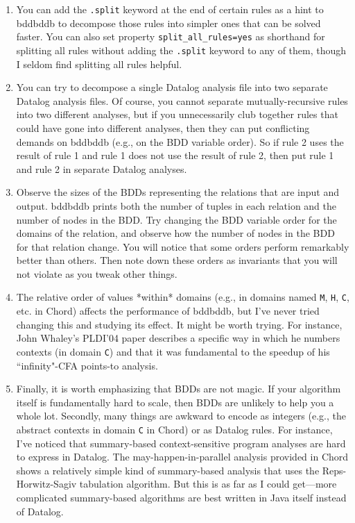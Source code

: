 \begin{enumerate}
\item
You can add the \verb+.split+ keyword at the end of certain rules as a
hint to bddbddb to decompose those rules into simpler ones that can be
solved faster.  You can also set property \verb+split_all_rules=yes+ as shorthand
for splitting all rules without adding the \verb+.split+ keyword to any of
them, though I seldom find splitting all rules helpful.

\item
You can try to decompose a single Datalog analysis file into two separate Datalog analysis
files.  Of course, you cannot separate mutually-recursive rules into two
different analyses, but if you unnecessarily club
together rules that could have gone into different analyses, then they
can put conflicting demands on bddbddb (e.g., on the BDD variable order).
So if rule 2 uses the result of rule 1 and rule 1 does not use the result of
rule 2, then put rule 1 and rule 2 in separate Datalog analyses.

\item
Observe the sizes of the BDDs representing the relations that are
input and output.  bddbddb prints both the number of tuples in each
relation and the number of nodes in the BDD.  Try changing the
BDD variable order for the domains of the relation, and observe how the
number of nodes in the BDD for that relation change.  You will
notice that some orders perform remarkably better than others.  Then
note down these orders as invariants that you will not violate as
you tweak other things.

\item
The relative order of values *within* domains (e.g.,
in domains named \verb+M+, \verb+H+, \verb+C+, etc. in Chord) affects the
performance of bddbddb, but
I've never tried changing this and studying its effect.  It might be
worth trying.  For instance, John Whaley's PLDI'04 paper describes a
specific way in which he numbers contexts (in domain \verb+C+) and that it was
fundamental to the speedup of his ``infinity"-CFA points-to analysis.

\item
Finally, it is worth emphasizing that BDDs are not magic.
If your algorithm itself is fundamentally hard to scale, then BDDs are
unlikely to help you a whole lot.  Secondly, many things are awkward to
encode as integers (e.g., the abstract contexts in domain \verb+C+ 
in Chord) or as Datalog rules.
For instance, I've noticed that summary-based context-sensitive program
analyses are hard to express in Datalog.  The may-happen-in-parallel
analysis provided in Chord shows a relatively simple kind of summary-based
analysis that uses the Reps-Horwitz-Sagiv tabulation algorithm.  But this
is as far as I could get---more complicated summary-based algorithms are
best written in Java itself instead of Datalog.
\end{enumerate}

